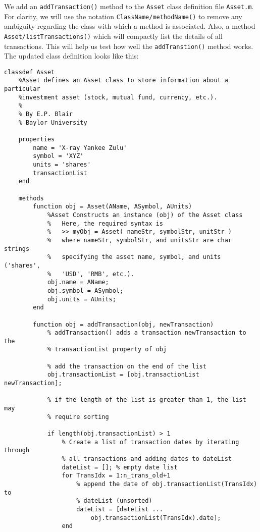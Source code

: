 We add an \texttt{addTransaction()} method to the \texttt{Asset} class definition file \texttt{Asset.m}. For clarity, we will use the notation \texttt{ClassName/methodName()} to remove any ambiguity regarding the class with which a method is associated. Also, a method \texttt{Asset/listTransactions()} which will compactly list the details of all transactions. This will help us test how well the \texttt{addTranstion()} method works. The updated class definition looks like this:
\begin{lstlisting}[style=Matlab-editor]
classdef Asset
    %Asset defines an Asset class to store information about a particular
    %investment asset (stock, mutual fund, currency, etc.).
    %
    % By E.P. Blair
    % Baylor University
    
    properties
        name = 'X-ray Yankee Zulu'
        symbol = 'XYZ'
        units = 'shares'
        transactionList
    end
    
    methods
        function obj = Asset(AName, ASymbol, AUnits)
            %Asset Constructs an instance (obj) of the Asset class
            %   Here, the required syntax is
            %   >> myObj = Asset( nameStr, symbolStr, unitStr )
            %   where nameStr, symbolStr, and unitsStr are char strings
            %   specifying the asset name, symbol, and units ('shares',
            %   'USD', 'RMB', etc.).
            obj.name = AName;
            obj.symbol = ASymbol;
            obj.units = AUnits;
        end
        
        function obj = addTransaction(obj, newTransaction)
            % addTransaction() adds a transaction newTransaction to the
            % transactionList property of obj
            
            % add the transaction on the end of the list
            obj.transactionList = [obj.transactionList newTransaction];
            
            % if the length of the list is greater than 1, the list may
            % require sorting
            
            if length(obj.transactionList) > 1
                % Create a list of transaction dates by iterating through
                % all transactions and adding dates to dateList
                dateList = []; % empty date list
                for TransIdx = 1:n_trans_old+1
                    % append the date of obj.transactionList(TransIdx) to
                    % dateList (unsorted)
                    dateList = [dateList ...
                        obj.transactionList(TransIdx).date];
                end
                

\end{lstlisting}
